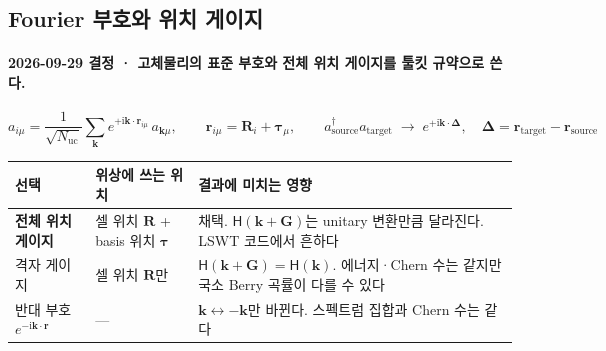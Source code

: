 \subsection{Fourier 부호와 위치 게이지}\label{fourier-convention}
\begingroup%
  \framesubtitle{2026-09-29 결정 · 고체물리의 표준 부호와 전체 위치 게이지를 툴킷 규약으로 쓴다.}
  \[
    a_{i\mu}=\frac{1}{\sqrt{N_{\mathrm{uc}}}}\sum_{\mathbf k}e^{+\mathrm i\mathbf k\cdot\mathbf r_{i\mu}}\,a_{\mathbf k\mu},
    \qquad \mathbf r_{i\mu}=\mathbf R_i+\symbf\tau_\mu,
    \qquad a^\dagger_{\mathrm{source}}a_{\mathrm{target}}\;\to\;e^{+\mathrm i\mathbf k\cdot\symbf\Delta},\quad
    \symbf\Delta=\mathbf r_{\mathrm{target}}-\mathbf r_{\mathrm{source}}
  \]
  \small
  \begin{tabularx}{\textwidth}{@{}P{2.4cm}P{3.6cm}Y@{}}
    \toprule
    선택 & 위상에 쓰는 위치 & 결과에 미치는 영향 \\
    \midrule
    \textbf{전체 위치 게이지} & 셀 위치 $\mathbf R$ + basis 위치 $\symbf\tau$ & 채택. $\mathsf H(\mathbf k+\mathbf G)$는 unitary 변환만큼 달라진다. LSWT 코드에서 흔하다 \\
    격자 게이지 & 셀 위치 $\mathbf R$만 & $\mathsf H(\mathbf k+\mathbf G)=\mathsf H(\mathbf k)$. 에너지·Chern 수는 같지만 국소 Berry 곡률이 다를 수 있다 \\
    반대 부호 $e^{-\mathrm i\mathbf k\cdot\mathbf r}$ & — & $\mathbf k\leftrightarrow-\mathbf k$만 바뀐다. 스펙트럼 집합과 Chern 수는 같다 \\
    \bottomrule
  \end{tabularx}
  \par\medskip
\endgroup


